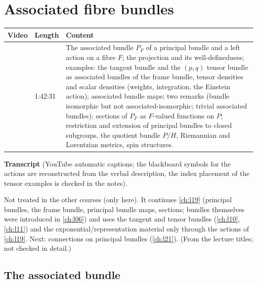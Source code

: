 \chapter{Associated fibre bundles}\label{ch:l20}
\providecommand{\lact}{\mathbin{\triangleright}}
\providecommand{\ract}{\mathbin{\triangleleft}}
\begin{paracol}{2}

\begin{sources}
\begin{tabularx}{\linewidth}{@{}l l L@{}}
\toprule
\textbf{Video} & \textbf{Length} & \textbf{Content}\\
\midrule
{} & 1:42:31 & The associated bundle $P_F$ of a principal bundle and a left action on a fibre $F$; the projection and its well-definedness; examples: the tangent bundle and the $(p,q)$ tensor bundle as associated bundles of the frame bundle, tensor densities and scalar densities (weights, integration, the Einstein action); associated bundle maps; two remarks (bundle isomorphic but not associated-isomorphic; trivial associated bundles); sections of $P_F$ as $F$-valued functions on $P$; restriction and extension of principal bundles to closed subgroups, the quotient bundle $P/H$, Riemannian and Lorentzian metrics, spin structures.\\
\bottomrule
\end{tabularx}

\smallskip
\textbf{Transcript}  (YouTube automatic captions; the blackboard symbols for the actions are reconstructed from the verbal description, the index placement of the tensor examples is checked in the notes).
\end{sources}

\begin{reading}
Not treated in the other courses (only here). It continues \cref{ch:l19} (principal bundles, the frame bundle, principal bundle maps, sections; bundles themselves were introduced in \cref{ch:l06}) and uses the tangent and tensor bundles (\cref{ch:l10}, \cref{ch:l11}) and the exponential/representation material only through the actions of \cref{ch:l19}. Next: connections on principal bundles (\cref{ch:l21}). (From the lecture titles; not checked in detail.)
\end{reading}

\section{The associated bundle}\label{sec:ab-def}


\end{paracol}
